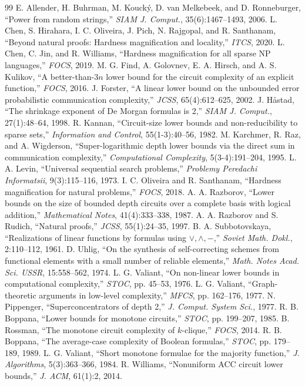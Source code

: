 \documentclass[11pt,a4paper]{article}
\theoremstyle{plain}
\theoremstyle{definition}
\theoremstyle{remark}
\begin{document}
\begin{thebibliography}{99}
 E. Allender, H. Buhrman, M. Kouck\'y, D. van Melkebeek, and D. Ronneburger, ``Power from random strings,'' \emph{SIAM J. Comput.}, 35(6):1467--1493, 2006.
 L. Chen, S. Hirahara, I. C. Oliveira, J. Pich, N. Rajgopal, and R. Santhanam, ``Beyond natural proofs: Hardness magnification and locality,'' \emph{ITCS}, 2020.
 L. Chen, C. Jin, and R. Williams, ``Hardness magnification for all sparse NP languages,'' \emph{FOCS}, 2019.
 M. G. Find, A. Golovnev, E. A. Hirsch, and A. S. Kulikov, ``A better-than-$3n$ lower bound for the circuit complexity of an explicit function,'' \emph{FOCS}, 2016.
 J. Forster, ``A linear lower bound on the unbounded error probabilistic communication complexity,'' \emph{JCSS}, 65(4):612--625, 2002.
 J. H\aa stad, ``The shrinkage exponent of De Morgan formulas is 2,'' \emph{SIAM J. Comput.}, 27(1):48--64, 1998.
 R. Kannan, ``Circuit-size lower bounds and non-reducibility to sparse sets,'' \emph{Information and Control}, 55(1-3):40--56, 1982.
 M. Karchmer, R. Raz, and A. Wigderson, ``Super-logarithmic depth lower bounds via the direct sum in communication complexity,'' \emph{Computational Complexity}, 5(3-4):191--204, 1995.
 L. A. Levin, ``Universal sequential search problems,'' \emph{Problemy Peredachi Informatsii}, 9(3):115--116, 1973.
 I. C. Oliveira and R. Santhanam, ``Hardness magnification for natural problems,'' \emph{FOCS}, 2018.
 A. A. Razborov, ``Lower bounds on the size of bounded depth circuits over a complete basis with logical addition,'' \emph{Mathematical Notes}, 41(4):333--338, 1987.
 A. A. Razborov and S. Rudich, ``Natural proofs,'' \emph{JCSS}, 55(1):24--35, 1997.
 B. A. Subbotovskaya, ``Realizations of linear functions by formulas using $\lor, \land, -$,'' \emph{Soviet Math. Dokl.}, 2:110--112, 1961.
 D. Uhlig, ``On the synthesis of self-correcting schemes from functional elements with a small number of reliable elements,'' \emph{Math. Notes Acad. Sci. USSR}, 15:558--562, 1974.
 L. G. Valiant, ``On non-linear lower bounds in computational complexity,'' \emph{STOC}, pp. 45--53, 1976.
 L. G. Valiant, ``Graph-theoretic arguments in low-level complexity,'' \emph{MFCS}, pp. 162--176, 1977.
 N. Pippenger, ``Superconcentrators of depth 2,'' \emph{J. Comput. System Sci.}, 1977.
 R. B. Boppana, ``Lower bounds for monotone circuits,'' \emph{STOC}, pp. 199--207, 1985.
 B. Rossman, ``The monotone circuit complexity of $k$-clique,'' \emph{FOCS}, 2014.
 R. B. Boppana, ``The average-case complexity of Boolean formulas,'' \emph{STOC}, pp. 179--189, 1989.
 L. G. Valiant, ``Short monotone formulae for the majority function,'' \emph{J. Algorithms}, 5(3):363--366, 1984.
 R. Williams, ``Nonuniform ACC circuit lower bounds,'' \emph{J. ACM}, 61(1):2, 2014.
\end{thebibliography}
\end{document}
